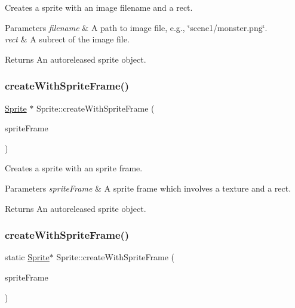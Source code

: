 Creates a sprite with an image filename and a rect.


\begin{DoxyParams}{Parameters}
{\em filename} & A path to image file, e.\+g., \char`\"{}scene1/monster.\+png\char`\"{}. \\
\hline
{\em rect} & A subrect of the image file. \\
\hline
\end{DoxyParams}
\begin{DoxyReturn}{Returns}
An autoreleased sprite object. 
\end{DoxyReturn}
\mbox{\label{classSprite_a3372a4e3fd88e2a1470a902b940aef42}} 
\subsubsection{\texorpdfstring{create\+With\+Sprite\+Frame()}{createWithSpriteFrame()}\hspace{0.1cm}{\footnotesize\ttfamily [1/2]}}
{\footnotesize\ttfamily \hyperlink{classSprite}{Sprite} $\ast$ Sprite\+::create\+With\+Sprite\+Frame (\begin{DoxyParamCaption}\item[{\hyperlink{classSpriteFrame}{Sprite\+Frame} $\ast$}]{sprite\+Frame }\end{DoxyParamCaption})\hspace{0.3cm}{\ttfamily [static]}}

Creates a sprite with an sprite frame.


\begin{DoxyParams}{Parameters}
{\em sprite\+Frame} & A sprite frame which involves a texture and a rect. \\
\hline
\end{DoxyParams}
\begin{DoxyReturn}{Returns}
An autoreleased sprite object. 
\end{DoxyReturn}
\mbox{\label{classSprite_a0f6b0927393d16cf576b04bd7d0eb851}} 
\subsubsection{\texorpdfstring{create\+With\+Sprite\+Frame()}{createWithSpriteFrame()}\hspace{0.1cm}{\footnotesize\ttfamily [2/2]}}
{\footnotesize\ttfamily static \hyperlink{classSprite}{Sprite}$\ast$ Sprite\+::create\+With\+Sprite\+Frame (\begin{DoxyParamCaption}\item[{\hyperlink{classSpriteFrame}{Sprite\+Frame} $\ast$}]{sprite\+Frame }\end{DoxyParamCaption})\hspace{0.3cm}{\ttfamily [static]}}

